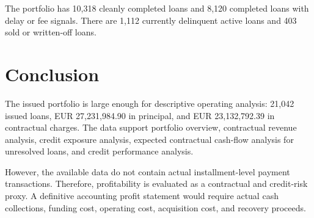 \documentclass[11pt]{article}
\begin{document}
The portfolio has 10,318 cleanly completed loans and 8,120 completed loans with delay or fee signals. There are 1,112 currently delinquent active loans and 403 sold or written-off loans.

\section{Conclusion}
The issued portfolio is large enough for descriptive operating analysis: 21,042 issued loans, EUR 27,231,984.90 in principal, and EUR 23,132,792.39 in contractual charges. The data support portfolio overview, contractual revenue analysis, credit exposure analysis, expected contractual cash-flow analysis for unresolved loans, and credit performance analysis.

However, the available data do not contain actual installment-level payment transactions. Therefore, profitability is evaluated as a contractual and credit-risk proxy. A definitive accounting profit statement would require actual cash collections, funding cost, operating cost, acquisition cost, and recovery proceeds.
\end{document}
